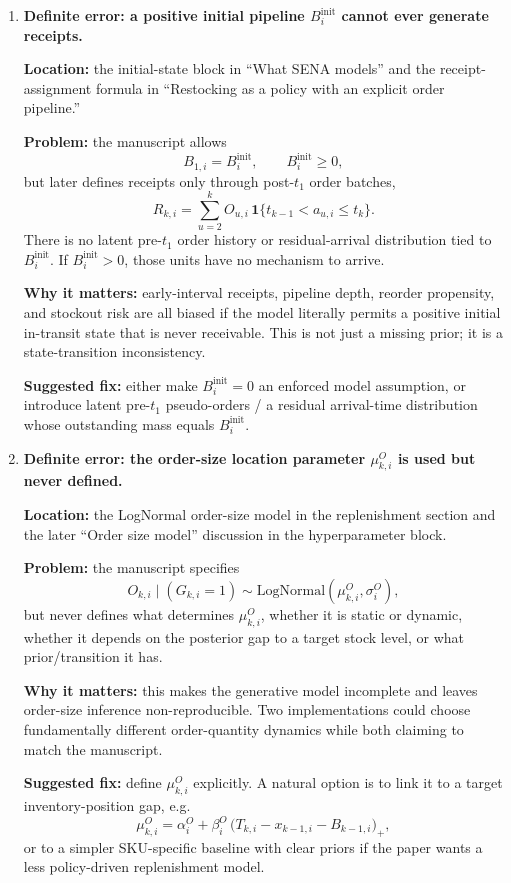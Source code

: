 \documentclass[11pt]{article}
\begin{document}
\begin{enumerate}
  \item \textbf{Definite error: a positive initial pipeline $B^{\mathrm{init}}_i$ cannot ever generate receipts.}

  \textbf{Location:} the initial-state block in ``What SENA models'' and the receipt-assignment formula in ``Restocking as a policy with an explicit order pipeline.''

  \textbf{Problem:} the manuscript allows
  \[
    B_{1,i}=B^{\mathrm{init}}_i,\qquad B^{\mathrm{init}}_i\ge 0,
  \]
  but later defines receipts only through post-$t_1$ order batches,
  \[
    R_{k,i}=\sum_{u=2}^{k} O_{u,i}\,\mathbf{1}\{t_{k-1}<a_{u,i}\le t_k\}.
  \]
  There is no latent pre-$t_1$ order history or residual-arrival distribution tied to $B^{\mathrm{init}}_i$.
  If $B^{\mathrm{init}}_i>0$, those units have no mechanism to arrive.

  \textbf{Why it matters:} early-interval receipts, pipeline depth, reorder propensity, and stockout risk are all biased if the model literally permits a positive initial in-transit state that is never receivable.
  This is not just a missing prior; it is a state-transition inconsistency.

  \textbf{Suggested fix:} either make $B^{\mathrm{init}}_i=0$ an enforced model assumption, or introduce latent pre-$t_1$ pseudo-orders / a residual arrival-time distribution whose outstanding mass equals $B^{\mathrm{init}}_i$.

  \item \textbf{Definite error: the order-size location parameter $\mu^{O}_{k,i}$ is used but never defined.}

  \textbf{Location:} the LogNormal order-size model in the replenishment section and the later ``Order size model'' discussion in the hyperparameter block.

  \textbf{Problem:} the manuscript specifies
  \[
    O_{k,i}\mid(G_{k,i}=1)\sim\text{LogNormal}(\mu^{O}_{k,i},\sigma^{O}_i),
  \]
  but never defines what determines $\mu^{O}_{k,i}$, whether it is static or dynamic, whether it depends on the posterior gap to a target stock level, or what prior/transition it has.

  \textbf{Why it matters:} this makes the generative model incomplete and leaves order-size inference non-reproducible.
  Two implementations could choose fundamentally different order-quantity dynamics while both claiming to match the manuscript.

  \textbf{Suggested fix:} define $\mu^{O}_{k,i}$ explicitly.
  A natural option is to link it to a target inventory-position gap, e.g.
  \[
    \mu^{O}_{k,i}=\alpha^{O}_i+\beta^{O}_i\,\bigl(T_{k,i}-x_{k-1,i}-B_{k-1,i}\bigr)_+,
  \]
  or to a simpler SKU-specific baseline with clear priors if the paper wants a less policy-driven replenishment model.


\end{enumerate}
\end{document}
